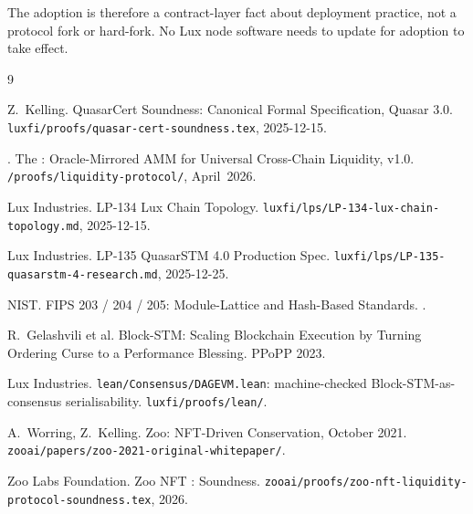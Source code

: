 \documentclass[11pt]{article}
\begin{document}
The adoption is therefore a contract-layer fact about deployment
practice, not a protocol fork or hard-fork. No Lux node software
needs to update for adoption to take effect.

\begin{thebibliography}{9}

Z.~Kelling.
\newblock QuasarCert Soundness: Canonical Formal Specification, Quasar 3.0.
\newblock \texttt{luxfi/proofs/quasar-cert-soundness.tex}, 2025-12-15.

.
\newblock The : Oracle-Mirrored AMM for Universal
         Cross-Chain Liquidity, v1.0.
\newblock \texttt{/proofs/liquidity-protocol/}, April~2026.

Lux Industries.
\newblock LP-134 Lux Chain Topology.
\newblock \texttt{luxfi/lps/LP-134-lux-chain-topology.md}, 2025-12-15.

Lux Industries.
\newblock LP-135 QuasarSTM 4.0 Production Spec.
\newblock \texttt{luxfi/lps/LP-135-quasarstm-4-research.md}, 2025-12-25.

NIST.
\newblock FIPS 203 / 204 / 205: Module-Lattice and Hash-Based Standards.
.

R.~Gelashvili et al.
\newblock Block-STM: Scaling Blockchain Execution by Turning Ordering
         Curse to a Performance Blessing.
\newblock PPoPP 2023.

Lux Industries.
\newblock \texttt{lean/Consensus/DAGEVM.lean}: machine-checked
         Block-STM-as-consensus serialisability.
\newblock \texttt{luxfi/proofs/lean/}.

A.~Worring, Z.~Kelling.
\newblock Zoo: NFT-Driven Conservation, October 2021.
\newblock \texttt{zooai/papers/zoo-2021-original-whitepaper/}.

Zoo Labs Foundation.
\newblock Zoo NFT : Soundness.
\newblock \texttt{zooai/proofs/zoo-nft-liquidity-protocol-soundness.tex}, 2026.

\end{thebibliography}
\end{document}
